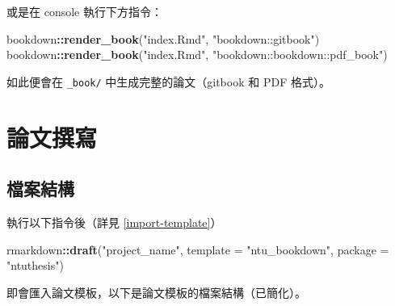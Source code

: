 \documentclass[oneside]{book}
\newenvironment{Shaded}{\begin{snugshade}}{\end{snugshade}}
\newcommand{\KeywordTok}[1]{\textcolor[rgb]{0.13,0.29,0.53}{\textbf{#1}}}
\newcommand{\DataTypeTok}[1]{\textcolor[rgb]{0.13,0.29,0.53}{#1}}
\newcommand{\StringTok}[1]{\textcolor[rgb]{0.31,0.60,0.02}{#1}}
\newcommand{\OperatorTok}[1]{\textcolor[rgb]{0.81,0.36,0.00}{\textbf{#1}}}
\newcommand{\NormalTok}[1]{#1}
\begin{document}
或是在 console 執行下方指令：

\begin{Shaded}
\begin{Highlighting}[]
\NormalTok{bookdown}\OperatorTok{::}\KeywordTok{render_book}\NormalTok{(}\StringTok{"index.Rmd"}\NormalTok{, }\StringTok{"bookdown::gitbook"}\NormalTok{)}
\NormalTok{bookdown}\OperatorTok{::}\KeywordTok{render_book}\NormalTok{(}\StringTok{"index.Rmd"}\NormalTok{, }\StringTok{"bookdown::bookdown::pdf_book"}\NormalTok{)}
\end{Highlighting}
\end{Shaded}

如此便會在 \texttt{\_book/} 中生成完整的論文（gitbook 和 PDF 格式）。

\chapter{論文撰寫}\label{write-thesis}

\section{檔案結構}\label{dir-structure}

執行以下指令後（詳見 \ref{import-template}）

\begin{Shaded}
\begin{Highlighting}[]
\NormalTok{rmarkdown}\OperatorTok{::}\KeywordTok{draft}\NormalTok{(}\StringTok{"project_name"}\NormalTok{,}
                 \DataTypeTok{template =} \StringTok{"ntu_bookdown"}\NormalTok{,}
                 \DataTypeTok{package =} \StringTok{"ntuthesis"}\NormalTok{)}
\end{Highlighting}
\end{Shaded}

即會匯入論文模板，以下是論文模板的檔案結構（已簡化）。
\end{document}
